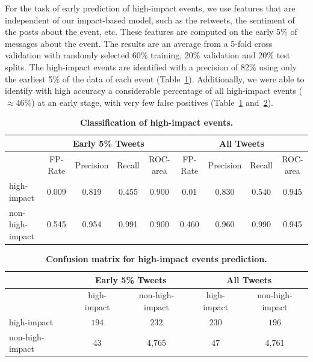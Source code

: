 \documentclass[10pt,letterpaper]{article}
\begin{document}
For the task of early prediction of high-impact events, we use features 
that are independent of our impact-based model, such as
the retweets, the sentiment of the posts about the event, etc. 
These features are computed on the early 5\% of messages about the event.
The results are an average from a 5-fold cross validation with
randomly selected 60\% training, 20\% validation and 20\% test splits.
The high-impact events are identified with a precision of 82\% using
only the earliest 5\% of the data of each event
(Table~\ref{tab:classification_results}).  Additionally, we were able to
identify with high accuracy a considerable percentage of all
high-impact events ($\approx 46\%$) at an early stage, with very few
false positives (Table~\ref{tab:classification_results} and~\ref{tab:confusion_matrix}).

\begin{table}
  \centering
  {\small
    \begin{tabularx}{\textwidth}{lcccc|cccc}
      \toprule
      & \multicolumn{4}{c}{\textbf{Early 5\% Tweets}} & \multicolumn{4}{c}{\textbf{All Tweets}} \\
      \midrule
      & FP-Rate & Precision & Recall & ROC-area & FP-Rate & Precision & Recall & ROC-area \\
      high-impact & 0.009 & 0.819 & 0.455 & 0.900 & 0.01 & 0.830 & 0.540 & 0.945 \\
      non-high-impact & 0.545 & 0.954 & 0.991 & 0.900 &  0.460 & 0.960 & 0.990 & 0.945 \\
      \bottomrule
    \end{tabularx}
  }
  \caption{\textbf{Classification of high-impact events.}}
  \label{tab:classification_results}
\end{table}

\begin{table}
  \centering
  \begin{tabularx}{\textwidth}{lcc|cc}
    \toprule
    \multirow{2}{*}{ }& \multicolumn{2}{c}{\textbf{Early 5\% Tweets}} & \multicolumn{2}{c}{\textbf{All Tweets}} \\
    \midrule
    & high-impact & non-high-impact & high-impact & non-high-impact \\
    high-impact & $194$ & $232$ & $230$ & $196$\\
    non-high-impact & $43$ & 4,765 & 47 & 4,761 \\
    \bottomrule
  \end{tabularx}
  \caption{\textbf{Confusion matrix for high-impact events prediction.}}
  \label{tab:confusion_matrix}
\end{table}
\end{document}
